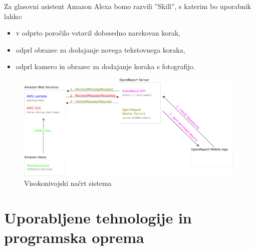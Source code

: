 \documentclass[a4paper, 12pt]{book}
\begin{document}


Za glasovni asistent Amazon Alexa bomo razvili ''Skill'', s katerim bo uporabnik lahko:

\begin{itemize}
	\item v odprto poročilo vstavil dobesedno narekovan korak,
	\item odprl obrazec za dodajanje novega tekstovnega koraka,
	\item odprl kamero in obrazec za dodajanje koraka s fotografijo.
\end{itemize}
% 
% 

\begin{figure}[H]
\begin{center}
\includegraphics[width=11cm]{plan}
\end{center}
\caption{Visokonivojski načrt sistema}
\label{plan}
\end{figure}

\section{Uporabljene tehnologije in programska oprema}
\end{document}
